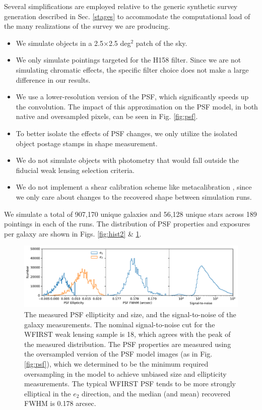 \documentclass[aps,prd, amsmath,amssymb,superscriptaddress,showkeys,nofootinbib,reprint,preprintnumbers]{revtex4-1}
\begin{document}
Several simplifications are employed relative to the generic synthetic survey generation described in Sec. \ref{stages} to accommodate the computational load of the many realizations of the survey we are producing. 
\begin{itemize}
\item We simulate objects in a 2.5$\times$2.5 deg$^2$ patch of the sky.
\item We only simulate pointings targeted for the H158 filter. 
Since we are not simulating chromatic effects, the specific filter choice does not make a large difference in our results.
\item We use a lower-resolution version of the PSF, which significantly speeds up the convolution.
The impact of this approximation on the PSF model, in both native and oversampled pixels, can be seen in Fig. \ref{fig:psf}. 
\item To better isolate the effects of PSF changes, we only utilize the isolated object postage stamps in shape measurement.
\item We do not simulate objects with photometry that would fall outside the fiducial weak lensing selection criteria.
\item We do not implement a shear calibration scheme like metacalibration \cite{SheldonHuff2017}, since we only care about changes to the recovered shape between simulation runs.
\end{itemize}

We simulate a total of 907,170 unique galaxies and 56,128 unique stars across 189 pointings in each of the runs. The distribution of PSF properties and exposures per galaxy are shown in Figs. \ref{fig:hist2} \& \ref{fig:hist3}.

\begin{figure}
\begin{center}
\includegraphics[width=\textwidth]{figures/hist3.pdf}
\end{center}
\caption[]{
The measured PSF ellipticity and size, and the signal-to-noise of the galaxy measurements. The nominal signal-to-noise cut for the WFIRST weak lensing sample is 18, which agrees with the peak of the measured distribution. The PSF properties are measured using the oversampled version of the PSF model images (as in Fig. \ref{fig:psf}), which we determined to be the minimum required oversampling in the model to achieve unbiased size and ellipticity measurements. The typical WFIRST PSF tends to be more strongly elliptical in the $e_2$ direction, and the median (and mean) recovered FWHM is 0.178 arcsec.
\label{fig:hist3}}
\end{figure}
\end{document}
